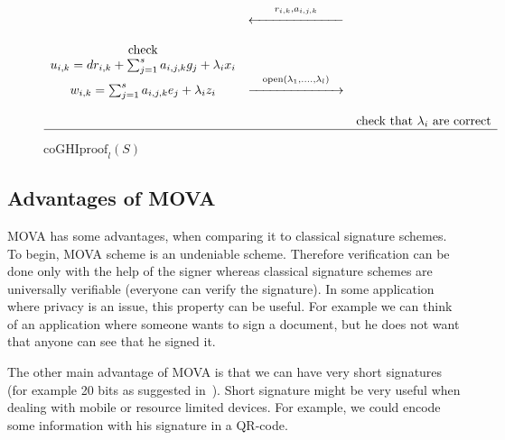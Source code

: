 \begin{figure}[!h]
\[\begin{array}{ccc}
                                                  &&\\
                                                  & \overset{r_{i,k},a_{i,j,k}}{\xleftarrow{\hspace*{70pt}}}           &                                   \\ 
                                                    &&\\
                                       \mbox{check} &&\\
        u_{i,k} = dr_{i,k} + \sum_{j=1}^{s}{a_{i,j,k}g_{j}} + \lambda_i x_i &&\\
           w_{i,k} = \sum_{j=1}^{s}{a_{i,j,k}e_{j}} + \lambda_i z_i   & \overset{\mathrm{open}(\lambda_1,....,\lambda_l)}{\xrightarrow{\hspace*{70pt}}}  &                                   \\
                                                  &&\\
                                                  &                                    & \mbox{check that $\lambda_i$ are correct}           \\
        \hline
        \end{array}
    \]
    \caption{$\mathrm{coGHIproof}_{l}(S)$}
    \label{fig:coghiproof}
\end{figure}


\subsection{Advantages of MOVA}
MOVA has some advantages, when comparing it to classical signature schemes. To begin, MOVA scheme is an undeniable scheme. Therefore
verification can be done only with the help of the signer whereas classical signature schemes are universally verifiable (everyone can verify the signature).
In some application where privacy is an issue, this property can be useful. For example we can think of an application where someone wants to sign a document,
but he does not want that anyone can see that he signed it.

The other main advantage of MOVA is that we can have very short signatures (for example 20 bits as suggested in~\cite{cite:thesis-monnerat}).
Short signature might be very useful when dealing with mobile or resource limited devices. For example, we could encode some information with his signature 
in a QR-code.
